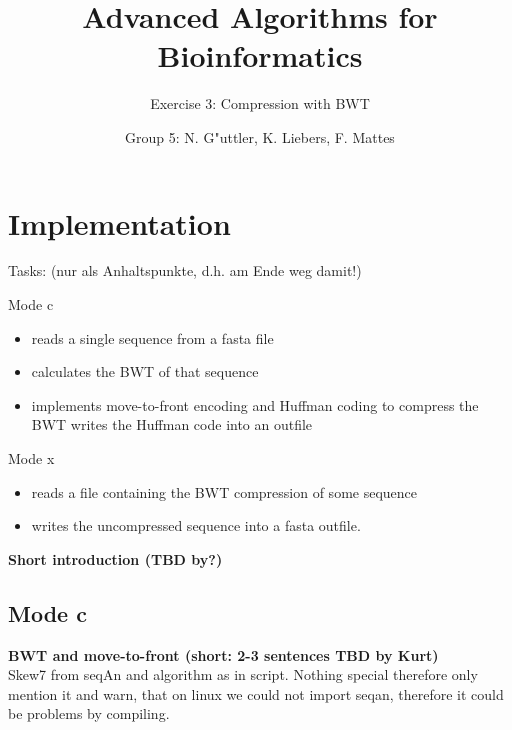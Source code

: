 \documentclass[11pt, notitlepage]{scrartcl}
\begin{document}
         


\title{Advanced Algorithms for Bioinformatics} 
\subtitle{Exercise 3: Compression with BWT}
\author{Group 5: N. G"uttler, K. Liebers, F. Mattes} %
\maketitle

\section{Implementation}


Tasks: (nur als Anhaltspunkte, d.h. am Ende weg damit!)

Mode c
\begin{itemize}
	\item   reads a single sequence from a fasta file
	   \item calculates the BWT of that sequence
    \item implements move-to-front encoding and Huffman coding to compress the BWT
    writes the Huffman code into an outfile 
	
\end{itemize}

Mode x
\begin{itemize}
	\item     reads a file containing the BWT compression of some sequence
	\item writes the uncompressed sequence into a fasta outfile. 
\end{itemize}

\textbf{Short introduction (TBD by?)}\\
\subsection{Mode c}




  
\textbf{BWT and move-to-front (short: 2-3 sentences TBD by Kurt)}\\
Skew7 from seqAn and algorithm as in script. Nothing special therefore only mention it and warn, that on linux we could not import seqan, therefore it could be problems by compiling.
\end{document}
